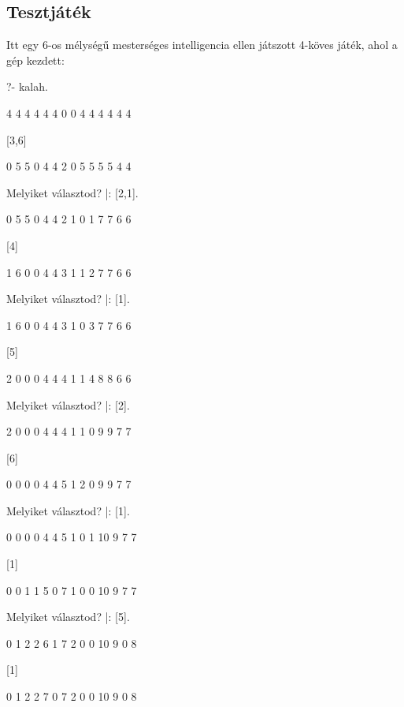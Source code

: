 \subsection*{Tesztjáték}
Itt egy 6-os mélységű mesterséges intelligencia
ellen játszott 4-köves játék, ahol a gép kezdett:
\begin{query}
?- kalah.

     4    4    4    4    4    4
0                                  0
     4    4    4    4    4    4

[3,6]

     0    5    5    0    4    4
2                                  0
     5    5    5    5    4    4

Melyiket választod?
|: [2,1].

     0    5    5    0    4    4
2                                  1
     0    1    7    7    6    6

[4]

     1    6    0    0    4    4
3                                  1
     1    2    7    7    6    6

Melyiket választod?
|: [1].

     1    6    0    0    4    4
3                                  1
     0    3    7    7    6    6

[5]

     2    0    0    0    4    4
4                                  1
     1    4    8    8    6    6

Melyiket választod?
|: [2].


     2    0    0    0    4    4
4                                  1
     1    0    9    9    7    7

[6]

     0    0    0    0    4    4
5                                  1
     2    0    9    9    7    7

Melyiket választod?
|: [1].

     0    0    0    0    4    4
5                                  1
     0    1    10   9    7    7

[1]

     0    0    1    1    5    0
7                                  1
     0    0    10   9    7    7

Melyiket választod?
|: [5].

     0    1    2    2    6    1
7                                  2
     0    0    10   9    0    8

[1]

     0    1    2    2    7    0
7                                  2
     0    0    10   9    0    8


\end{query}

